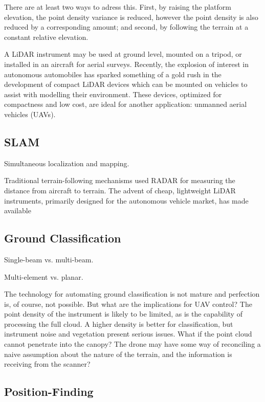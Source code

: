 \documentclass[10pt,a4paper]{report}
\begin{document}
There are at least two ways to adress this. First, by raising the platform elevation, the point density variance is reduced, however the point density is also reduced by a corresponding amount; and second, by following the terrain at a constant relative elevation.

A LiDAR instrument may be used at ground level, mounted on a tripod, or installed in an aircraft for aerial surveys. Recently, the explosion of interest in autonomous automobiles has sparked something of a gold rush in the development of compact LiDAR devices which can be mounted on vehicles to assist with modelling their environment. These devices, optimized for compactness and low cost, are ideal for another application: unmanned aerial vehicles (UAVs).


\subsection{SLAM}

Simultaneous localization and mapping.

Traditional terrain-following mechanisms used RADAR for measuring the distance from aircraft to terrain. The advent of cheap, lightweight LiDAR instruments, primarily designed for the autonomous vehicle market, has made available 

\subsection{Ground Classification}

Single-beam vs. multi-beam.

Multi-element vs. planar. \cite{Nobili2015}

The technology for automating ground classification is not mature \cite{Vosselman2001,Vosselman2000} and perfection is, of course, not possible. But what are the implications for UAV control? The point density of the instrument is likely to be limited, as is the capability of processing the full cloud. A higher density is better for classification, but instrument noise and vegetation present serious issues. What if the point cloud cannot penetrate into the canopy? The drone may have some way of reconciling a naive assumption about the nature of the terrain, and the information is receiving from the scanner?

\subsection{Position-Finding}
\end{document}
